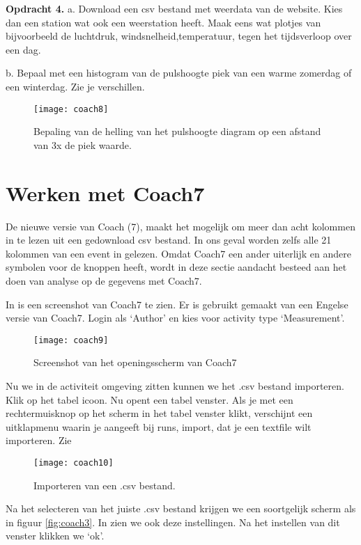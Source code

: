 \textbf{Opdracht 4.}
a.
Download een csv bestand met weerdata van de \hisparc website.
Kies dan een \hisparc station wat ook een weerstation heeft.
Maak eens wat plotjes van bijvoorbeeld de luchtdruk, windsnelheid,temperatuur,
tegen het tijdsverloop over een dag.

b. Bepaal met een histogram van de pulshoogte piek van een warme zomerdag of 
een winterdag. Zie je verschillen. 

\begin{figure}
    \centering
    \texttt{[image: coach8]}
    \caption{Bepaling van de helling van het pulshoogte diagram op een afstand
    van 3x de piek waarde.}
    \label{fig:coach8}
\end{figure}

\section{Werken met Coach7}

De nieuwe versie van Coach (7), maakt het mogelijk om meer dan acht kolommen in te lezen
uit een gedownload csv bestand. In ons geval worden zelfs alle 21 kolommen van een event in gelezen.
Omdat Coach7 een ander uiterlijk en andere symbolen voor de knoppen heeft, wordt 
in deze sectie aandacht besteed aan het doen van analyse op de gegevens met Coach7.

In  is een screenshot van Coach7 te zien. Er is gebruikt gemaakt van een Engelse versie van 
Coach7. Login als `Author' en kies voor activity type `Measurement'.

\begin{figure}
    \centering
    \texttt{[image: coach9]}
    \caption{Screenshot van het openingsscherm van Coach7}
    \label{fig:coach9}
\end{figure}

Nu we in de activiteit omgeving zitten kunnen we het .csv bestand importeren.
Klik op het tabel icoon. Nu opent een tabel venster.
Als je met een rechtermuisknop op het scherm in het tabel venster klikt, verschijnt 
een uitklapmenu waarin je aangeeft bij runs, import, dat je een textfile wilt importeren. 
Zie 

\begin{figure}
    \centering
    \texttt{[image: coach10]}
    \caption{Importeren van een .csv bestand.}
    \label{fig:coach10}
\end{figure}

Na het selecteren van het juiste .csv bestand krijgen we een soortgelijk scherm
als in figuur \ref{fig:coach3}. In  zien we ook deze instellingen.
Na het instellen van dit venster klikken we `ok'.

